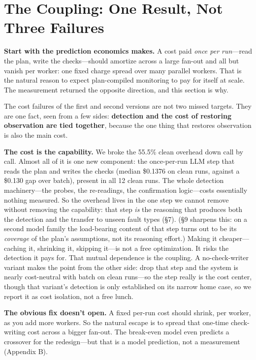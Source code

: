 \documentclass[acmsmall,screen]{acmart}
\begin{document}
\section{The Coupling: One Result, Not Three Failures}
\textbf{Start with the prediction economics makes.} A cost paid \emph{once per
run}---read the plan, write the checks---should amortize across a large fan-out
and all but vanish per worker: one fixed charge spread over many parallel
workers. That is the natural reason to expect plan-compiled monitoring to pay for
itself at scale. The measurement returned the opposite direction, and this
section is why.

The cost failures of the first and second versions are not two missed targets.
They are one fact, seen from a few sides: \textbf{detection and the cost of
restoring observation are tied together}, because the one thing that restores
observation is also the main cost.

\textbf{The cost is the capability.} We broke the 55.5\% clean overhead down
call by call. Almost all of it is one new component: the once-per-run LLM step
that reads the plan and writes the checks (median \$0.1376 on clean runs,
against a \$0.130 gap over batch), present in all 12 clean runs. The whole
detection machinery---the probes, the re-readings, the confirmation
logic---costs essentially nothing measured. So the overhead lives in the one
step we cannot remove without removing the capability: that step \emph{is} the
reasoning that produces both the detection and the transfer to unseen fault
types (\S7). (\S9 sharpens this: on a second model family the load-bearing content
of that step turns out to be its \emph{coverage} of the plan's assumptions, not
its reasoning effort.) Making it cheaper---caching it, shrinking it, skipping
it---is not a free optimization. It risks the detection it pays for. That mutual dependence is
the coupling. A no-check-writer variant makes the point from the other side:
drop that step and the system is nearly cost-neutral with batch on clean
runs---so the step really is the cost center, though that variant's detection is
only established on its narrow home case, so we report it as cost isolation, not
a free lunch.

\textbf{The obvious fix doesn't open.} A fixed per-run cost should shrink, per
worker, as you add more workers. So the natural escape is to spread that
one-time check-writing cost across a bigger fan-out. The break-even model even
predicts a crossover for the redesign---but that is a model prediction, not a
measurement (Appendix B).
\end{document}
